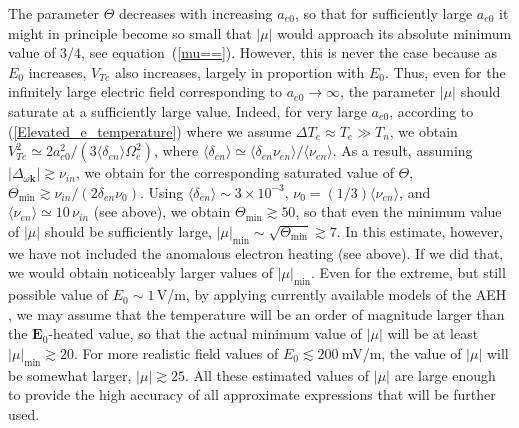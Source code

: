 \documentclass[draft]{agujournal2019}
\renewcommand{\vec}{\mathbf}
\begin{document}
The parameter $\Theta$ decreases with increasing $a_{e0}$, so that for sufficiently
large $a_{e0}$ it might in principle become so small that $|\mu| $ 
would approach its absolute minimum value of $3/4$, see equation~(\ref{mu==}). However,
this is never the case because as $E_{0}$ increases, $V_{Te}$ also increases, largely in 
proportion with $E_{0}$. Thus, even for the infinitely large electric field 
corresponding to $a_{e0}\rightarrow\infty$, the parameter $|\mu|$ should saturate
at a sufficiently large value. Indeed, for very large $a_{e0}$, according to
(\ref{Elevated_e_temperature}) where we assume $\Delta T_{e}\approx T_{e}\gg
T_{n}$, we obtain $V_{Te}^{2}\simeq2a_{e0}^{2}/(3\langle \delta
_{en}\rangle \Omega_{e}^{2})$, where $\langle \delta_{en}\rangle \simeq\langle \delta_{en}\nu_{en}\rangle
/\langle \nu_{en}\rangle $. As a result, assuming $|\Delta_{\omega\vec{k}}| \gtrsim\nu_{in}$, we obtain for the
corresponding saturated value of $\Theta$, $\Theta_{\min}\gtrsim\nu_{in}/(2\delta
_{en}\nu_{0})$. Using $\langle \delta_{en}\rangle \sim
3\times10^{-3}$, $\nu_{0}=(1/3)  \langle \nu_{en}
\rangle $, and $\langle \nu_{en}\rangle \simeq10\,\nu_{in}$
(see above), we obtain $\Theta_{\min}\gtrsim50$, so that even the minimum value of
$|\mu|$ should be sufficiently large, $|\mu|_{\min}\sim\sqrt{\Theta_{\min}}\gtrsim7$. In this estimate, however, we have not included
the anomalous electron heating (see above). If we did that, we would obtain
noticeably larger values of $|\mu|_{\min}$. Even for the
extreme, but still possible value of $E_{0}\sim1\,$V/m, by applying currently
available models of the AEH \cite{Dimant:Model03,Liang:Time-dependent21}, we
may assume that the temperature will be an order of magnitude larger than the
$\vec{E}_{0}$-heated value, so that the actual minimum value of $\left\vert
\mu\right\vert $ will be at least $|\mu|_{\min}\gtrsim
20$. For more realistic field values of $E_{0}\lesssim200\ $mV/m, the value of
$|\mu|$ will be somewhat larger, $|\mu|\gtrsim25$. All these estimated values of $|\mu|$ are large enough
to provide the high accuracy of all approximate expressions that will be further used.
\end{document}
